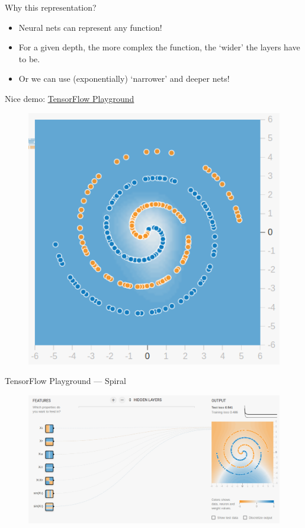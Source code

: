 \documentclass[lualatex, aspectratio=169]{beamer}
\begin{document}
\begin{frame}{Why this representation?}

  \begin{itemize}
    \item Neural nets can represent any function!
    \item For a given depth, the more complex the function, the `wider' the layers have to be.
    \item Or we can use (exponentially) `narrower' and deeper nets!
  \end{itemize}

  Nice demo: \href{https://playground.tensorflow.org}{TensorFlow Playground}
  \begin{figure}
    \includegraphics[width=0.2\pagewidth]{assets/swirl.png}
  \end{figure}


\end{frame}


\begin{frame}{TensorFlow Playground --- Spiral}

  \begin{figure}
    \centering
    \includegraphics[height=0.75\pageheight]{assets/0-hidden.png}
  \end{figure}

\end{frame}
\end{document}
